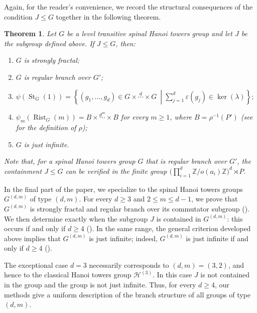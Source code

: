 \documentclass[11pt,leqno]{amsart}
\theoremstyle{plain}
\newtheorem{thmx}{Theorem}
\DeclareMathOperator{\St}{St}
\DeclareMathOperator{\Rist}{Rist}
\numberwithin{equation}{section}
\begin{document}
Again, for the reader’s convenience, we record the structural consequences of the condition $J\leq G$ together in the following theorem.


\begin{thmx}\label{thmB}
Let $G$ be a level transitive spinal Hanoi towers group and let $J$ be the subgroup defined above. If $J\leq G$, then:
\begin{enumerate}
    \item $G$ is strongly fractal;
    \item $G$ is  regular branch over $G'$;
    \item $\psi(\St_G(1))
=
\left\{
(g_1,\ldots,g_d)\in G\times \stackrel{d}{\cdots}\times G \ \middle| \sum_{j=1}^d \varepsilon(g_j)\in \ker(\lambda)
\right\};$
 \item $\psi_m(\Rist_G(m))=B\times\stackrel{d^m}{\cdots}\times B$ for every $m\geq 1$, where $B=\rho^{-1}(P')$ (see  for the definition of $\rho$);
    \item $G$ is just infinite.
\end{enumerate}
Note that, for  a spinal Hanoi towers group $G$ that is regular branch over $G'$, the containment $J\leq G$ can be verified in the finite group $\bigl(\prod_{i=1}^d\mathbb{Z}/o(a_i)\mathbb{Z}\bigr)^d\rtimes P$.
\end{thmx}

\medskip
In the final part of the paper, we specialize to the spinal Hanoi towers
groups $G^{(d,m)}$ of type $(d,m)$. For every $d\geq 3$ and
$2\leq m\leq d-1$, we prove that $G^{(d,m)}$ is strongly fractal and
regular branch over its commutator subgroup
(). We then determine exactly when the subgroup
$J$ is contained in $G^{(d,m)}$: this occurs if and only if
$d\geq 4$ (). In the same range, the general
criterion developed above implies that $G^{(d,m)}$ is just infinite;
indeed, $G^{(d,m)}$ is just infinite if and only if $d\geq 4$
().

The exceptional case $d=3$ necessarily corresponds to
$(d,m)=(3,2)$, and hence to the classical Hanoi towers group
$\mathcal{H}^{(3)}$. In this case $J$ is not contained in the group
and the group is not just infinite. Thus, for every $d\geq 4$, our
methods give a uniform description of the branch structure of all groups
of type $(d,m)$.\\
\end{document}
